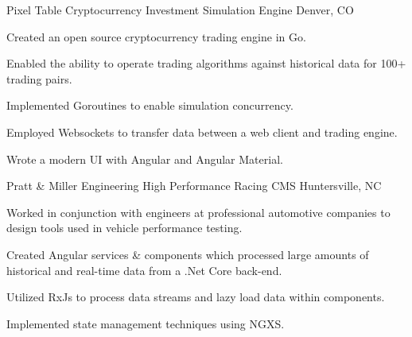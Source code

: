 

\begin{cventries}

    \cventry
    {Pixel Table} %
    {Cryptocurrency Investment Simulation Engine} %
    {Denver, CO} %
    {} %
    {
    \begin{cvitems} %
        \item {Created an open source cryptocurrency trading engine in Go.}
        \item {Enabled the ability to operate trading algorithms against historical data for 100+ trading pairs.}
        \item {Implemented Goroutines to enable simulation concurrency.}
        \item {Employed Websockets to transfer data between a web client and trading engine.}
        \item {Wrote a modern UI with Angular and Angular Material.}
    \end{cvitems}
    }

    \cventry
    {Pratt \& Miller Engineering} %
    {High Performance Racing CMS} %
    {Huntersville, NC} %
    {} %
    {
    \begin{cvitems} %
        \item {Worked in conjunction with engineers at professional automotive companies to design tools used in vehicle performance testing.}
        \item {Created Angular services \& components which processed large amounts of historical and real-time data from a .Net Core back-end.}
        \item {Utilized RxJs to process data streams and lazy load data within components.}
        \item {Implemented state management techniques using NGXS.}
    \end{cvitems}
    }


\end{cventries}
